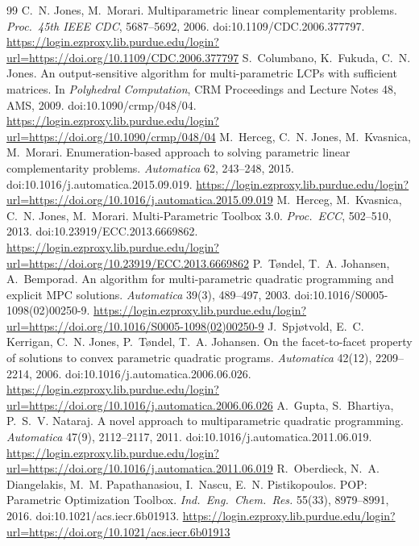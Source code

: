 \documentclass[11pt]{article}
\begin{document}
\begin{thebibliography}{99}\small
\setlength{\itemsep}{2pt}
 C.~N. Jones, M.~Morari. Multiparametric linear complementarity problems. \emph{Proc.\ 45th IEEE CDC}, 5687--5692, 2006. doi:10.1109/CDC.2006.377797.
\url{https://login.ezproxy.lib.purdue.edu/login?url=https://doi.org/10.1109/CDC.2006.377797}
 S.~Columbano, K.~Fukuda, C.~N. Jones. An output-sensitive algorithm for multi-parametric LCPs with sufficient matrices. In \emph{Polyhedral Computation}, CRM Proceedings and Lecture Notes 48, AMS, 2009. doi:10.1090/crmp/048/04.
\url{https://login.ezproxy.lib.purdue.edu/login?url=https://doi.org/10.1090/crmp/048/04}
 M.~Herceg, C.~N. Jones, M.~Kvasnica, M.~Morari. Enumeration-based approach to solving parametric linear complementarity problems. \emph{Automatica} 62, 243--248, 2015. doi:10.1016/j.automatica.2015.09.019.
\url{https://login.ezproxy.lib.purdue.edu/login?url=https://doi.org/10.1016/j.automatica.2015.09.019}
 M.~Herceg, M.~Kvasnica, C.~N. Jones, M.~Morari. Multi-Parametric Toolbox 3.0. \emph{Proc.\ ECC}, 502--510, 2013. doi:10.23919/ECC.2013.6669862.
\url{https://login.ezproxy.lib.purdue.edu/login?url=https://doi.org/10.23919/ECC.2013.6669862}
 P.~T{\o}ndel, T.~A. Johansen, A.~Bemporad. An algorithm for multi-parametric quadratic programming and explicit MPC solutions. \emph{Automatica} 39(3), 489--497, 2003. doi:10.1016/S0005-1098(02)00250-9.
\url{https://login.ezproxy.lib.purdue.edu/login?url=https://doi.org/10.1016/S0005-1098(02)00250-9}
 J.~Spj{\o}tvold, E.~C. Kerrigan, C.~N. Jones, P.~T{\o}ndel, T.~A. Johansen. On the facet-to-facet property of solutions to convex parametric quadratic programs. \emph{Automatica} 42(12), 2209--2214, 2006. doi:10.1016/j.automatica.2006.06.026.
\url{https://login.ezproxy.lib.purdue.edu/login?url=https://doi.org/10.1016/j.automatica.2006.06.026}
 A.~Gupta, S.~Bhartiya, P.~S.~V. Nataraj. A novel approach to multiparametric quadratic programming. \emph{Automatica} 47(9), 2112--2117, 2011. doi:10.1016/j.automatica.2011.06.019.
\url{https://login.ezproxy.lib.purdue.edu/login?url=https://doi.org/10.1016/j.automatica.2011.06.019}
 R.~Oberdieck, N.~A. Diangelakis, M.~M. Papathanasiou, I.~Nascu, E.~N. Pistikopoulos. POP: Parametric Optimization Toolbox. \emph{Ind.\ Eng.\ Chem.\ Res.} 55(33), 8979--8991, 2016. doi:10.1021/acs.iecr.6b01913.
\url{https://login.ezproxy.lib.purdue.edu/login?url=https://doi.org/10.1021/acs.iecr.6b01913}

\end{thebibliography}
\end{document}
